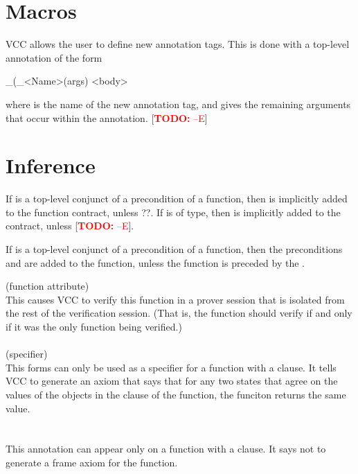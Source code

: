 \documentclass[preprint,nocopyrightspace]{sigplanconf}
\newcommand{\todo}[1]{[\textcolor{red}{\textbf{TODO:} {#1}}]}
\begin{document}
{\section{Macros}
VCC allows the user to define new annotation tags. This is done with
a top-level annotation of the form
\begin{VCC}
_(\bool \macro_<Name>(args) {
  <body>
}
\end{VCC}
where  is the name of the new annotation tag,
and  gives the remaining arguments that occur within the
annotation. \todo{--E}

\section{Inference}

If  is a top-level conjunct of a precondition of a
function, then   is implicitly added
to the function contract, unless ??. If  is of \vcc{\claim}
type, then  is implicitly added to
the contract, unless \todo{--E}.

If  is a top-level conjunct of a
precondition of a function, then the
preconditions 
and  are added to the
function, unless the function is preceded by the .


 (function attribute)\\
This causes VCC to verify this function in a prover session that is
isolated from the rest of the verification session. (That is, the
function should verify if and only if it was the only function being verified.)
\\\\
 (specifier)\\
This forms can only be used as a specifier for a   function
with a  clause. It tells VCC to generate an axiom that says
that for any two states that agree on the values of the objects in the
 clause of the function, the funciton returns the same
value.
\\\\
\\
This annotation can appear only on a  function with
a  clause. It says not to generate a frame axiom for the
function. 



}
\end{document}
